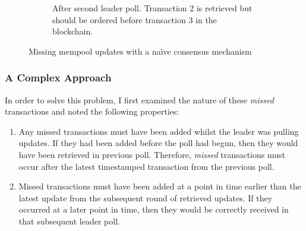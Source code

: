 \documentclass[12pt,a4paper,twoside,openright]{report}
\begin{document}
\begin{figure}
\begin{subfigure}[t]{0.40\textwidth}
			\caption{After second leader poll. Transaction 2 is retrieved but should be ordered before transaction 3 in the blockchain.}
		\end{subfigure}
		\caption{Missing mempool updates with a na\"{i}ve consensus mechanism}	
		\label{fig:readremotepartudpatesbroke}
	\end{figure}
	\subsubsection*{A Complex Approach}
	In order to solve this problem, I first examined the nature of these \textit{missed} transactions and noted the following properties:
	\begin{enumerate}
		\item Any missed transactions must have been added whilst the leader was pulling updates. 
		If they had been added before the poll had begun, then they would have been retrieved in previous poll. 
		Therefore, \textit{missed} transactions must occur after the latest timestamped transaction from the previous poll. 
		\item Missed transactions must have been added at a point in time earlier than the latest update from the subsequent round of retrieved updates.
		If they occurred at a later point in time, then they would be correctly received in that subsequent leader poll.
	\end{enumerate}
\end{document}

